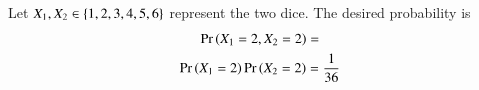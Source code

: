 Let $X_1,X_2 \in \left\{1,2,3,4,5,6\right\}$ represent the two dice.  The desired probability is
\begin{multline}
\Pr\left(X_1=2, X_2 = 2\right) = 
\\
\Pr\left(X_1=2\right) 
\Pr\left(X_2 = 2\right) = \frac{1}{36}
\end{multline}
